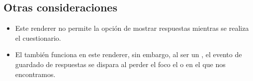 \subsection{Otras consideraciones}
\label{subsec:Apendice2.17}

\begin{itemize}
  \item Este renderer no permite la opci\'on de mostrar respuestas mientras se realiza el cuestionario.
  \item El  tambi\'en funciona en este renderer, sin embargo, al ser un , el evento de guardado de respuestas se dispara al perder el foco
  el  o  en el que nos encontramos.
\end{itemize}